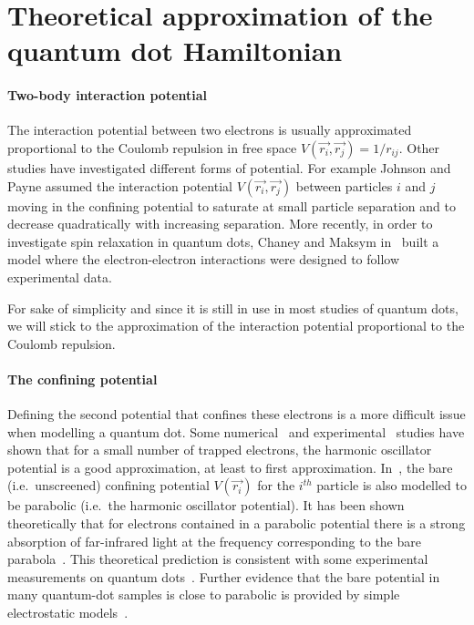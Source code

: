 \section{Theoretical approximation of the quantum dot Hamiltonian}


\label{sec:potential}
\paragraph{Two-body interaction potential}
The interaction potential between two electrons is usually approximated proportional to the Coulomb repulsion in free space $V(\vec{r_i},\vec{r_j})=1/r_{ij}$. Other studies have investigated different forms of potential. For example Johnson and Payne \cite{johnsonPayne} assumed the interaction potential $V(\vec{r_i},\vec{r_j})$ between particles $i$ and $j$ moving in the confining potential to saturate at small particle separation and to decrease quadratically with increasing separation.
More recently, in order to investigate spin relaxation in quantum dots, Chaney and Maksym in~\cite{Chaney2007} built a model where the electron-electron interactions were designed to follow experimental data.

For sake of simplicity and since it is still in use in most studies of quantum dots, we will stick to the approximation of the interaction potential proportional to the Coulomb repulsion.


\paragraph{The confining potential} Defining the second potential that confines these electrons is a more difficult issue when modelling a quantum dot. Some numerical~\cite{KumarA1990,Macucci1993,Macucci1997,Stopa1996} and experimental~\cite{Kohn1961,Heitmann1993,Heitmann1995} studies have shown that for a small number of trapped electrons, the harmonic oscillator potential is a good approximation, at least to first approximation.
In~\cite{johnsonPayne}, the bare (i.e.\ unscreened) confining potential $V(\vec{r_i})$ for the $i^{th}$ particle is also modelled to be parabolic (i.e.\ the harmonic oscillator potential). It has been shown theoretically that for electrons contained in a parabolic potential there is a strong absorption of far-infrared light at the frequency corresponding to the bare parabola~\cite{Brey1989,Peeters1990,Yip1991,Li1991}. This theoretical prediction is consistent with some experimental measurements on quantum dots~\cite{Sikorski1989}. Further evidence that the bare potential in many quantum-dot samples is close to parabolic is provided by simple electrostatic models~\cite{Dempsey1990}.

